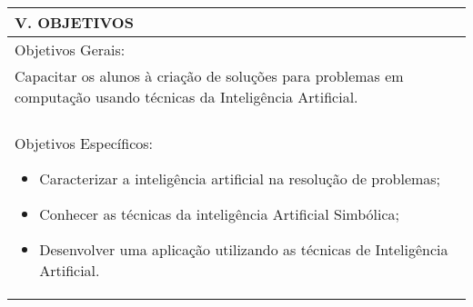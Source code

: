 \documentclass[12pt]{article}
\begin{document}
\begin{longtable}{|L{1.025\textwidth}|} \hline
%
{\bf V. OBJETIVOS } \\ \hline
%
Objetivos Gerais: \\
Capacitar os alunos à criação de soluções para problemas em computação usando técnicas da Inteligência Artificial.\\
 \\
Objetivos Específicos:
\begin{itemize}
\item Caracterizar a inteligência artificial na resolução de problemas;
\item Conhecer as técnicas da inteligência Artificial Simbólica;
\item Desenvolver uma aplicação utilizando as técnicas de Inteligência Artificial.
\end{itemize}
\\ \hline
\end{longtable}
\end{document}
